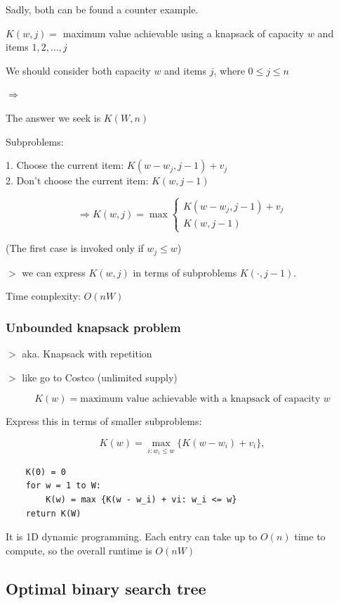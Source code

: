 \documentclass[12pt,a4paper]{article}
\newcommand{\remark}[1]{
    {\small $>$ {\color{blue} #1}}
}
\begin{document}
Sadly, both can be found a counter example.

$K(w, j) =$ maximum value achievable using a knapsack of capacity $w$ and items $1, 2, \dots, j$

We should consider both capacity $w$ and items $j$, where $0 \leq j \leq n$

$\Rightarrow$

The answer we seek is $K(W, n)$

Subproblems:

1. Choose the current item: $K(w - w_j, j - 1) + v_j$ \\
2. Don't choose the current item: $K(w, j - 1)$

\[
\Rightarrow
K(w, j) = \max \left\{
\begin{array}{l}
    K(w - w_j, j - 1) + v_j \\
    K(w, j - 1)
\end{array}
\right.
\]

\begin{center}
(The first case is invoked only if $w_j \leq w$)
\end{center}

\remark{we can express $K(w, j)$ in terms of subproblems $K(\cdot, j - 1)$.}

Time complexity: $O(nW)$

\subsubsection*{Unbounded knapsack problem}

\remark{aka. Knapsack with repetition}

\remark{like go to Costco (unlimited supply)}

\[K(w) = \text{maximum value achievable with a knapsack of capacity } w\]

Express this in terms of smaller subproblems:

\[
K(w) = \max_{i : w_i \leq w} \{ K(w - w_i) + v_i \},
\]

\begin{verbatim}
    K(0) = 0
    for w = 1 to W:
        K(w) = max {K(w - w_i) + vi: w_i <= w}
    return K(W)
\end{verbatim}

It is 1D dynamic programming. Each entry can take up to $O(n)$ time to compute, so the overall runtime is $O(nW)$ 

\subsection*{Optimal binary search tree}
\end{document}
